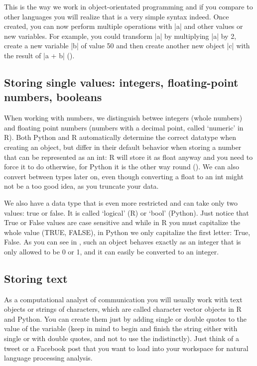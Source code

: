 This is the way we work in object-orientated programming and if you
compare to other languages you will realize that is a very simple
syntax indeed. Once created, you can now perform multiple operations
with |a| and other values or new variables. For example, you
could transform |a| by multiplying |a| by 2, create a new
variable |b| of value 50 and then create another new object
|c| with the result of |a + b| ().





\subsection{Storing single values: integers, floating-point numbers, booleans}

When working with numbers, we distinguish betwee integers (whole
numbers) and floating point numbers (numbers with a decimal point,
called `numeric' in R). Both Python and R automatically determine the
correct datatype when creating an object, but differ in their default
behavior when storing a number that can be represented as an int: R
will store it as float anyway and you need to force it to do
otherwise, for Python it is the other way round
(). We can also convert between types later on,
even though converting a float to an int might not be a too good idea,
as you truncate your data.

We also have a data type that is even more restricted and can take
only two values: true or false. It is called `logical' (R) or `bool'
(Python).  Just notice that True or False values are case sensitive
and while in R you must capitalize the whole value (TRUE, FALSE), in
Python we only capitalize the first letter: True, False.  As you can
see in , such an object behaves exactly as an integer that
is only allowed to be 0 or 1, and it can easily be converted to an
integer.





\subsection{Storing text}

As a computational analyst of communication you will usually work with
text objects or strings of characters, which are called character
vector objects in R and Python. You can create them just by adding single or double quotes to the value of the variable (keep in mind to begin and finish the string either with single or with double quotes, and not to use the indistinctly). Just think of a tweet or a Facebook post that you want to load into your workspace for natural
language processing analysis.

